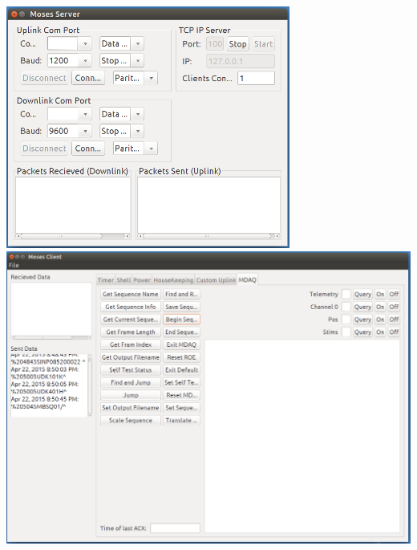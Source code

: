 \documentclass[landscape,xcolor={table}]{beamer}
\begin{document}
\begin{frame}
\begin{columns}[T]
\begin{column}{.45\textwidth}
			\includegraphics[width=0.7\textwidth]{server_scr} \\
			\includegraphics[width=\textwidth]{client_scr}
					
		\end{column}%
		\end{columns}

	\end{frame}
	
\end{document}
